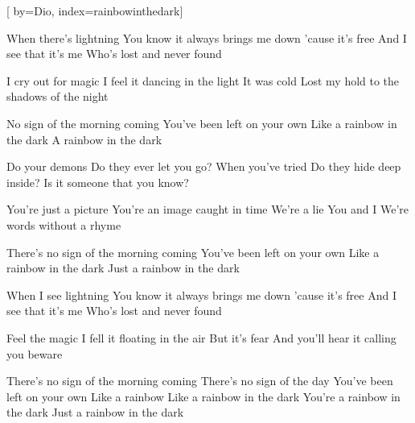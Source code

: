 
[%
    by={Dio},
    index={rainbowinthedark}]


    \label{rainbowinthedark}

    \begin{center}
    \end{center}

    \beginverse
        When there's lightning
        You know it always brings me down
        'cause it's free
        And I see that it's me
        Who's lost and never found

        I cry out for magic
        I feel it dancing in the light
        It was cold
        Lost my hold to the shadows of the night
    \endverse

    \beginchorus
        No sign of the morning coming
        You've been left on your own
        Like a rainbow in the dark
        A rainbow in the dark
    \endchorus

    \beginverse
        Do your demons
        Do they ever let you go?
        When you've tried
        Do they hide deep inside?
        Is it someone that you know?

        You're just a picture
        You're an image caught in time
        We're a lie
        You and I
        We're words without a rhyme
    \endverse

    \beginchorus
        There's no sign of the morning coming
        You've been left on your own
        Like a rainbow in the dark
        Just a rainbow in the dark
    \endchorus

    \beginverse
        When I see lightning
        You know it always brings me down
        'cause it's free
        And I see that it's me
        Who's lost and never found

        Feel the magic
        I fell it floating in the air
        But it's fear
        And you'll hear it calling you beware
    \endverse

    \beginchorus
        There's no sign of the morning coming
        There's no sign of the day
        You've been left on your own
        Like a rainbow
        Like a rainbow in the dark
        You're a rainbow in the dark
        Just a rainbow in the dark
    \endchorus
\endsong
